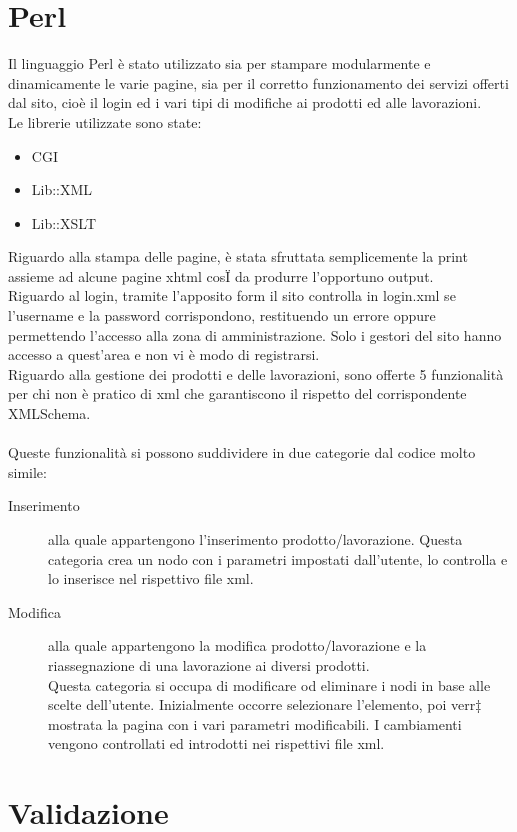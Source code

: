 \documentclass[11pt]{article}
\begin{document}
\section{Perl}
Il linguaggio Perl è stato utilizzato sia per stampare modularmente e dinamicamente le varie pagine, sia per il corretto funzionamento dei servizi offerti dal sito, cioè il login ed i vari tipi di modifiche ai prodotti ed alle lavorazioni.
\\Le librerie utilizzate sono state:
\begin{itemize}
	\item  CGI
	\item Lib::XML
	\item Lib::XSLT
\end{itemize}
Riguardo alla stampa delle pagine, è stata sfruttata semplicemente la print assieme ad alcune pagine xhtml cosÏ da produrre l'opportuno output.
\\Riguardo al login, tramite l'apposito form il sito controlla in login.xml se l'username e la password corrispondono, restituendo un errore oppure permettendo l'accesso alla zona di amministrazione. Solo i gestori del sito hanno accesso a quest'area e non vi è modo di registrarsi.
\\Riguardo alla gestione dei prodotti e delle lavorazioni, sono offerte 5 funzionalità per chi non è pratico di xml che garantiscono il rispetto del corrispondente XMLSchema.
\\
\\Queste funzionalità si possono suddividere in due categorie dal codice molto simile:

\begin{description}
	\item[Inserimento] alla quale appartengono l'inserimento prodotto/lavorazione. Questa categoria crea un nodo con i parametri impostati dall'utente, lo controlla e lo inserisce nel rispettivo file xml.
	\item[Modifica] alla quale appartengono la modifica prodotto/lavorazione e la riassegnazione di una lavorazione ai diversi prodotti.
	\\Questa categoria si occupa di modificare od eliminare i nodi in base alle scelte dell'utente.  Inizialmente occorre selezionare l'elemento, poi verr‡ mostrata la pagina con i vari parametri modificabili. I cambiamenti vengono controllati ed introdotti nei rispettivi file xml.
	
\end{description}
\newpage
\section{Validazione}
\end{document}
